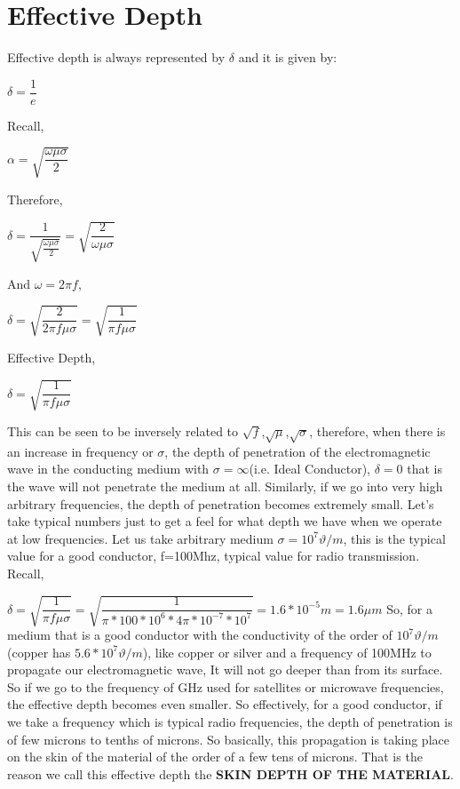 \section{\textbf{Effective Depth}}

Effective depth is always represented by $\delta$ and it is given by:

$\delta=\dfrac{1}{e}$

Recall,
\begin{center}
$\alpha=\sqrt{\dfrac{\omega\mu\sigma}{2}}$
\end{center}

Therefore,
\begin{center}
$\delta=\dfrac{1}{\sqrt{\frac{\omega\mu\sigma}{2}}}=\sqrt{\dfrac{2}{\omega\mu\sigma}}$
\end{center}

And $\omega=2\pi f$,
\begin{center}
$\delta=\sqrt{\dfrac{2}{2\pi f\mu\sigma}}=\sqrt{\dfrac{1}{\pi f \mu\sigma}}$	
\end{center}

Effective Depth, \begin{center}
$\delta=\sqrt{\dfrac{1}{\pi f \mu\sigma}}$
\end{center}

This can be seen to be inversely related to $\sqrt{f}$,$\sqrt{\mu}$,$\sqrt{\sigma}$, therefore, when there is an increase in frequency or $\sigma$, the depth of penetration of the electromagnetic wave in the conducting medium with $\sigma=\infty$(i.e. Ideal Conductor), $\delta=0$ that is the wave will not penetrate the medium at all. Similarly, if we go into very high arbitrary frequencies, the depth of penetration becomes extremely small. Let's take typical numbers just to get a feel for what depth we have when we operate at low frequencies.\newline
Let us take arbitrary medium $\sigma=10^{7}\vartheta/m$, this is the typical value for a good conductor, f=100Mhz, typical value for radio transmission.\newline
Recall,

$\delta=\sqrt{\dfrac{1}{\pi f\mu\sigma}}=\sqrt{\dfrac{1}{\pi*100*10^{6}*4\pi*10^{-7}*10^{7}}}=1.6*10^{-5}m=1.6\mu m$
So, for a medium that is a good conductor with the conductivity of the order of  $ 10^{7}\vartheta/m  $ (copper has $ 5.6 * 10^{7}\vartheta/m $), like copper or silver and a frequency of 100MHz to propagate our electromagnetic wave, It will not go deeper than from its surface. So if we go to the frequency of GHz used for satellites or microwave frequencies, the effective depth becomes even smaller. So effectively, for a good conductor, if we take a frequency which is typical radio frequencies, the depth of penetration is of few microns to tenths of microns. So basically, this propagation is taking place on the skin of the material of the order of a few tens of microns. That is the reason we call this effective depth the \textbf{SKIN DEPTH OF THE MATERIAL}.

